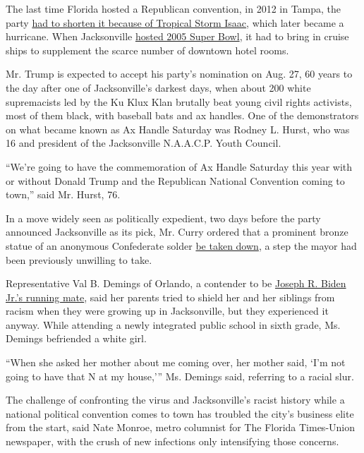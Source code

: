 The last time Florida hosted a Republican convention, in 2012 in Tampa,
the party
\href{https://www.nytimes.com/2012/08/27/us/politics/isaac-rewrites-script-for-republican-convention.html}{had
to shorten it because of Tropical Storm Isaac}, which later became a
hurricane. When Jacksonville
\href{https://www.nytimes.com/2005/01/28/sports/football/jacksonville-prepares-to-welcome-the-world.html}{hosted
2005 Super Bowl}, it had to bring in cruise ships to supplement the
scarce number of downtown hotel rooms.

Mr. Trump is expected to accept his party's nomination on Aug. 27, 60
years to the day after one of Jacksonville's darkest days, when about
200 white supremacists led by the Ku Klux Klan brutally beat young civil
rights activists, most of them black, with baseball bats and ax handles.
One of the demonstrators on what became known as Ax Handle Saturday was
Rodney L. Hurst, who was 16 and president of the Jacksonville N.A.A.C.P.
Youth Council.

``We're going to have the commemoration of Ax Handle Saturday this year
with or without Donald Trump and the Republican National Convention
coming to town,'' said Mr. Hurst, 76.

In a move widely seen as politically expedient, two days before the
party announced Jacksonville as its pick, Mr. Curry ordered that a
prominent bronze statue of an anonymous Confederate solder
\href{https://www.nytimes.com/aponline/2020/06/09/us/ap-us-confederate-monument-florida.html}{be
taken down}, a step the mayor had been previously unwilling to take.

Representative Val B. Demings of Orlando, a contender to be
\href{https://www.nytimes.com/article/biden-vice-president-2020.html}{Joseph
R. Biden Jr.'s running mate}, said her parents tried to shield her and
her siblings from racism when they were growing up in Jacksonville, but
they experienced it anyway. While attending a newly integrated public
school in sixth grade, Ms. Demings befriended a white girl.

``When she asked her mother about me coming over, her mother said, `I'm
not going to have that N at my house,''' Ms. Demings said, referring to
a racial slur.

The challenge of confronting the virus and Jacksonville's racist history
while a national political convention comes to town has troubled the
city's business elite from the start, said Nate Monroe, metro columnist
for The Florida Times-Union newspaper, with the crush of new infections
only intensifying those concerns.

